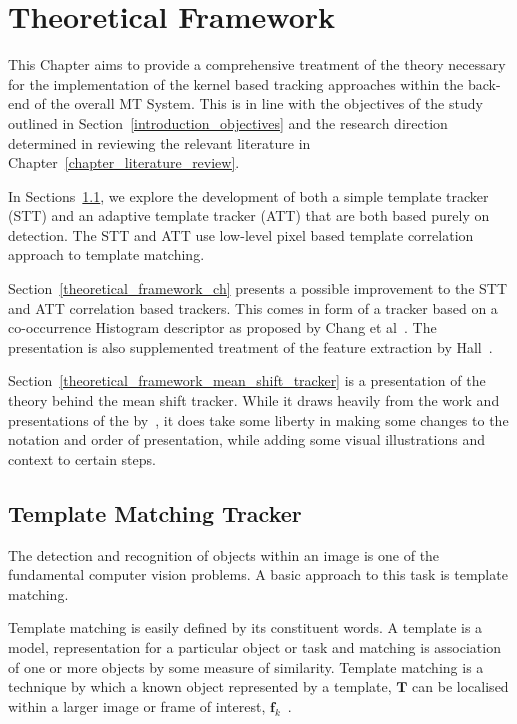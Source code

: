 \chapter{Theoretical Framework}\label{chapter_theoretical_framework}
This Chapter aims to provide a comprehensive treatment of the theory necessary
for the implementation of the kernel based tracking approaches within the
back-end of the overall MT System. This is in line with the objectives
of the study outlined in
Section~\ref{introduction_objectives} and the research direction determined in
reviewing the relevant literature in Chapter~\ref{chapter_literature_review}.

In Sections~\ref{theoretical_framework_tm}, we explore the development of both a
simple template tracker (STT) and an adaptive template tracker (ATT) that are
both based purely on detection. The STT and ATT use low-level pixel based
template correlation approach to template matching.

Section~\ref{theoretical_framework_ch} presents a possible improvement to
the STT and ATT correlation based trackers. This comes in form of a tracker
based on a co-occurrence Histogram descriptor as proposed by Chang et
al~\cite{Chang1999}. The presentation is also supplemented treatment of the
feature extraction by Hall~\cite{Hall-beyer2018}.

Section~\ref{theoretical_framework_mean_shift_tracker} is a presentation of the
theory behind the mean shift tracker. While it draws heavily from the
work and presentations of the by~\cite{Comaniciu2002, Comaniciu2003,
lecture}, it does take some liberty in making some changes to the notation and
order of presentation, while adding some visual illustrations and
context to certain steps. 

\section{Template Matching Tracker}\label{theoretical_framework_tm}
The detection and recognition of objects within an image is one of the
fundamental computer vision problems. A basic approach to this task is template
matching.

Template matching is easily defined by its constituent words. A template is a
model, representation for a particular object or task and matching is
association of one or more objects by some measure of similarity. Template
matching is a technique by which a known object represented by a template,
$\mathbf{T}$ can be localised within a larger image or frame of interest,
$\mathbf{f}_k$~\cite{Brunelli}.

